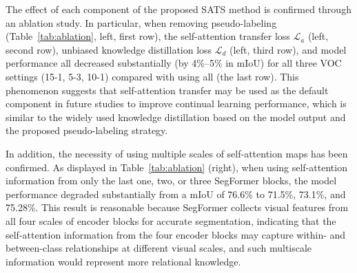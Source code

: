 \documentclass[onecolumn,conference,compsoc]{IEEEtran}
\begin{document}
\begin{spacing}{1.5}
The effect of each component of the proposed SATS method is confirmed  {through an} ablation study. In particular, when removing pseudo-labeling (Table~\ref{tab:ablation}, left, first row), the self-attention transfer loss $\mathcal{L}_a$ (left, second row), unbiased knowledge distillation loss $\mathcal{L}_d$ (left, third row), and model performance all decreased substantially (by 4\%–5\% in mIoU) for all three VOC settings (15-1, 5-3, 10-1) compared  {with} using all (the last row). This  {phenomenon} suggests that self-attention transfer may be used as the default component in future studies  {to improve} continual learning performance,  {which is similar to} the widely used knowledge distillation based on the model output and the proposed pseudo-labeling strategy.

 {In addition,} the necessity of using multiple scales of self-attention maps  {has been} confirmed. As  {displayed in} Table~\ref{tab:ablation} (right), when using self-attention information from only the last one, two, or three SegFormer blocks, the model performance  {degraded} substantially from a mIoU of 76.6\% to 71.5\%, 73.1\%, and 75.28\%. This result is reasonable because SegFormer collects visual features from all four scales of encoder blocks for accurate segmentation,  {indicating} that the self-attention information from the four encoder blocks may capture within- and between-class relationships at different visual scales, and  {such multiscale} information would represent more relational knowledge.


\begin{table*}[tbp]
    \caption{\normalsize Ablation study of the proposed SATS. Left: effect of SATS components on continual learning with three VOC settings. Right: the necessity of using multiscale self-attention transfer. PL: pseudo-labeling. }
    \centering
    \small{
        }
\end{table*}
\end{spacing}
\end{document}

